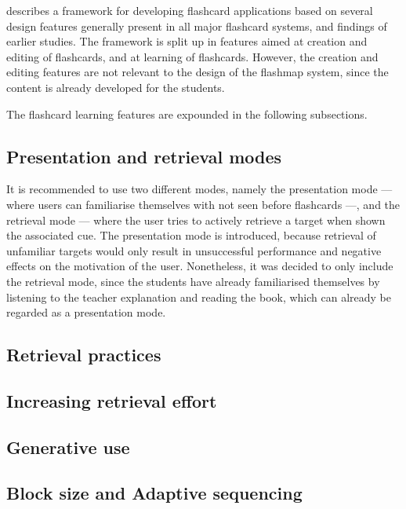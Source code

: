  describes a framework for developing flashcard applications based on several design features generally present in all major flashcard systems, and findings of earlier studies. The framework is split up in features aimed at creation and editing of flashcards, and at learning of flashcards. However, the creation and editing features are not relevant to the design of the flashmap system, since the content is already developed for the students.

The flashcard learning features are expounded in the following subsections.

        \subsection{Presentation and retrieval modes}

It is recommended to use two different modes, namely the presentation mode --- where users can familiarise themselves with not seen before flashcards ---, and the retrieval mode --- where the user tries to actively retrieve a target when shown the associated cue. The presentation mode is introduced, because retrieval of unfamiliar targets would only result in unsuccessful performance and negative effects on the motivation of the user. Nonetheless, it was decided to only include the retrieval mode, since the students have already familiarised themselves by listening to the teacher explanation and reading the book, which can already be regarded as a presentation mode.

        \subsection{Retrieval practices}



        \subsection{Increasing retrieval effort}

        \subsection{Generative use}

        \subsection{Block size and Adaptive sequencing}

